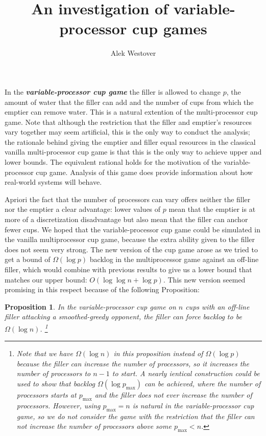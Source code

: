 \documentclass{article}[11pt]
\title{An investigation of variable-processor cup games}
\author{Alek Westover}
\newcommand{\defn}[1]{{\textit{\textbf{\boldmath #1}}}}
\newtheorem{proposition}{Proposition}
\begin{document}
\maketitle

In the \defn{variable-processor cup game} the filler is allowed to change $p$,
the amount of water that the filler can add and the number of cups from which
the emptier can remove water. This is a natural extention of the
multi-processor cup game. Note that although the restriction that the filler
and emptier's resources vary together may seem artificial, this is the only way
to conduct the analysis; the rationale behind giving the emptier and filler
equal resources in the classical vanilla multi-processor cup game is that 
this is the only way to achieve upper and lower bounds. The equivalent rational holds
for the motivation of the variable-processor cup game. Analysis of this game
does provide information about how real-world systems will behave.

Apriori the fact that the number of processors can vary offers neither the
filler nor the emptier a clear advantage: lower values of $p$ mean that the
emptier is at more of a discretization disadvantage but also mean that the
filler can anchor fewer cups.  We hoped that the variable-processor cup game
could be simulated in the vanilla multiprocessor cup game, because the extra
ability given to the filler does not seem very strong. The new version of the
cup game arose as we tried to get a bound of $\Omega(\log p)$ backlog in the
multiprocessor game against an off-line filler, which would combine with
previous results to give us a lower bound that matches our upper bound:
$O(\log\log n + \log p)$. This new version seemed promising in this respect
because of the following Proposition:

\begin{proposition}
  \label{prop:dprand}
  In the variable-processor cup game on $n$ cups with an off-line filler
  attacking a smoothed-greedy opponent, the filler can force backlog to be
  $\Omega(\log n)$.
\footnote{Note that we have $\Omega(\log n)$ in this proposition instead of $\Omega(\log
p)$ because the filler can increase the number of processors, so it increases
the number of processors to $n-1$ to start. A nearly ientical construction
could be used to show that backlog $\Omega(\log p_{\max})$ can be achieved,
where the number of processors starts at $p_{\max}$ and the filler does not
ever increase the number of processors. However, using $p_{\max} = n$ is 
natural in the variable-processor cup game, so we do not consider the game with 
the restriction that the filler can not increase the number of processors above
some $p_{\max} < n$.}
\end{proposition}
\end{document}
